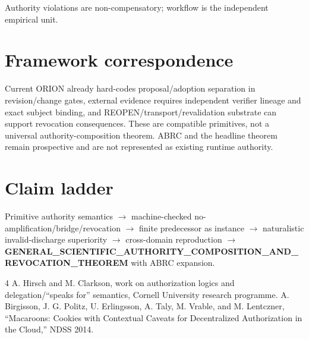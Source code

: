 \documentclass[11pt]{article}
\begin{document}
Authority violations are non-compensatory; workflow is the independent empirical unit.

\section{Framework correspondence}
Current ORION already hard-codes proposal/adoption separation in revision/change gates, external evidence requires independent verifier lineage and exact subject binding, and REOPEN/transport/revalidation substrate can support revocation consequences. These are compatible primitives, not a universal authority-composition theorem. ABRC and the headline theorem remain prospective and are not represented as existing runtime authority.

\section{Claim ladder}
Primitive authority semantics $\rightarrow$ machine-checked no-amplification/bridge/revocation $\rightarrow$ finite predecessor as instance $\rightarrow$ naturalistic invalid-discharge superiority $\rightarrow$ cross-domain reproduction $\rightarrow$ \textbf{GENERAL\_SCIENTIFIC\_AUTHORITY\_COMPOSITION\_AND\_REVOCATION\_THEOREM} with ABRC expansion.

\begin{thebibliography}{4}
 A. Hirsch and M. Clarkson, work on authorization logics and delegation/``speaks for'' semantics, Cornell University research programme.
 A. Birgisson, J. G. Politz, U. Erlingsson, A. Taly, M. Vrable, and M. Lentczner, ``Macaroons: Cookies with Contextual Caveats for Decentralized Authorization in the Cloud,'' NDSS 2014.
\end{thebibliography}
\end{document}

